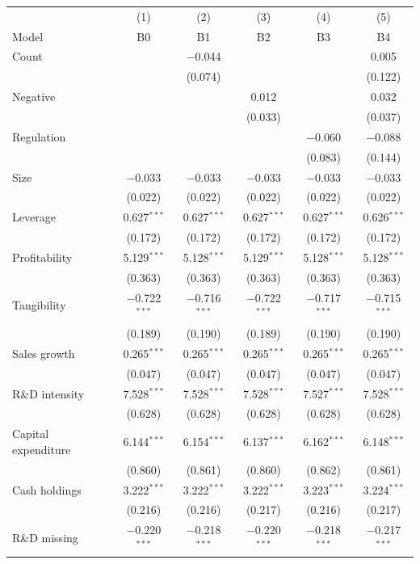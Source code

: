 \begin{tabular}{lccccc}
\toprule
 & (1) & (2) & (3) & (4) & (5) \\
Model & B0 & B1 & B2 & B3 & B4 \\
\midrule
Count &  & $-$0.044 &  &  & 0.005 \\
 &  & (0.074) &  &  & (0.122) \\
Negative &  &  & 0.012 &  & 0.032 \\
 &  &  & (0.033) &  & (0.037) \\
Regulation &  &  &  & $-$0.060 & $-$0.088 \\
 &  &  &  & (0.083) & (0.144) \\
Size & $-$0.033 & $-$0.033 & $-$0.033 & $-$0.033 & $-$0.033 \\
 & (0.022) & (0.022) & (0.022) & (0.022) & (0.022) \\
Leverage & 0.627$^{***}$ & 0.627$^{***}$ & 0.627$^{***}$ & 0.627$^{***}$ & 0.626$^{***}$ \\
 & (0.172) & (0.172) & (0.172) & (0.172) & (0.172) \\
Profitability & 5.129$^{***}$ & 5.128$^{***}$ & 5.129$^{***}$ & 5.128$^{***}$ & 5.128$^{***}$ \\
 & (0.363) & (0.363) & (0.363) & (0.363) & (0.363) \\
Tangibility & $-$0.722$^{***}$ & $-$0.716$^{***}$ & $-$0.722$^{***}$ & $-$0.717$^{***}$ & $-$0.715$^{***}$ \\
 & (0.189) & (0.190) & (0.189) & (0.190) & (0.190) \\
Sales growth & 0.265$^{***}$ & 0.265$^{***}$ & 0.265$^{***}$ & 0.265$^{***}$ & 0.265$^{***}$ \\
 & (0.047) & (0.047) & (0.047) & (0.047) & (0.047) \\
R\&D intensity & 7.528$^{***}$ & 7.528$^{***}$ & 7.528$^{***}$ & 7.527$^{***}$ & 7.528$^{***}$ \\
 & (0.628) & (0.628) & (0.628) & (0.628) & (0.628) \\
Capital expenditure & 6.144$^{***}$ & 6.154$^{***}$ & 6.137$^{***}$ & 6.162$^{***}$ & 6.148$^{***}$ \\
 & (0.860) & (0.861) & (0.860) & (0.862) & (0.861) \\
Cash holdings & 3.222$^{***}$ & 3.222$^{***}$ & 3.222$^{***}$ & 3.223$^{***}$ & 3.224$^{***}$ \\
 & (0.216) & (0.216) & (0.217) & (0.216) & (0.217) \\
R\&D missing & $-$0.220$^{***}$ & $-$0.218$^{***}$ & $-$0.220$^{***}$ & $-$0.218$^{***}$ & $-$0.217$^{***}$ \\

\end{tabular}
